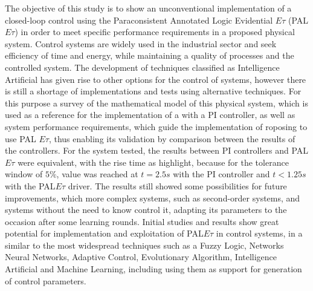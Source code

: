 





The objective of this study is to show an unconventional implementation
of a closed-loop control using the Paraconsistent 
Annotated Logic Evidential $E\tau$ (PAL $E\tau$)
in order to meet specific performance requirements in a proposed physical system.
Control systems are widely used in the industrial sector and
seek efficiency of time and energy,
while maintaining a quality of processes and the controlled system.
The development of techniques classified as Intelligence
Artificial has given rise to other options for the control of systems,
however there is still a shortage of implementations and tests using alternative techniques.
For this purpose a survey of the mathematical model of this
physical system, which is used as a reference for the implementation of a
with a PI controller,
as well as system performance requirements,
which guide the implementation of roposing to use PAL $E\tau$,
thus enabling its validation by comparison between the results of the controllers.
For the system tested, the results between PI controllers and
PAL$E\tau$ were equivalent, with the rise time as
highlight, because for the tolerance window of $5\%$,
value was reached at $ t = 2.5s $ with the PI controller and 
$ t < 1.25s$ with the PAL$E\tau$ driver. 
The results still showed some
possibilities for future improvements, which
more complex systems, such as second-order systems, and
systems without the need to know
control it, adapting its parameters to the occasion after some
learning rounds.
Initial studies and results show great potential for
implementation and exploitation of PAL$E\tau$ in control systems, in a
similar to the most widespread techniques such as a Fuzzy Logic, Networks
Neural Networks, Adaptive Control, Evolutionary Algorithm, Intelligence
Artificial and Machine Learning, including
using them as support for generation of control parameters.
